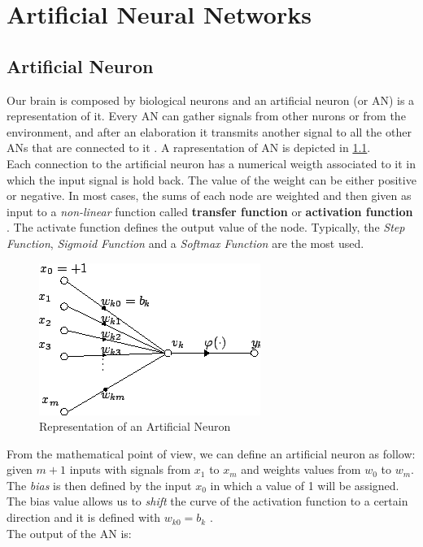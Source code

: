\chapter{Artificial Neural Networks}
\section{Artificial Neuron}
Our brain is composed by biological neurons and an artificial neuron (or AN) is a representation of it. Every AN can gather signals from other nurons or from the environment, and after an elaboration it transmits another signal to all the other ANs that are connected to it \cite{engelbrecht2007computational}. A rapresentation of AN is depicted in \ref{fig:artificial_neuron}. \\
Each connection to the artificial neuron has a numerical weigth associated to it in which the input signal is hold back. The value of the weight can be either positive or negative. In most cases, the sums of each node are weighted and then given as input to a \textit{non-linear} function called \textbf{transfer function} or \textbf{activation function} \cite{artificial_neuron_wiki}. The activate function defines the output value of the node. Typically, the \textit{Step Function}, \textit{Sigmoid Function} and a \textit{Softmax Function} are the most used.

\begin{figure}[!ht]
    \centering
    \includegraphics[scale=0.5]{Figures/artificial_neuron.png}
    \caption{Representation of an Artificial Neuron \cite{artificial_neuron_wiki}}
    \label{fig:artificial_neuron}
\end{figure}

\noindent From the mathematical point of view, we can define an artificial neuron as follow: \\
given $m+1$ inputs with signals from $x_1$ to $x_m$ and weights values from $w_0$ to $w_m$. The \textit{bias} is then defined by the input $x_0$ in which a value of 1 will be assigned. The bias value allows us to \textit{shift} the curve of the activation function to a certain direction and it is defined with $w_{k0} = b_k$ \cite{artificial_neuron_wiki}. \\
The output of the AN is:


